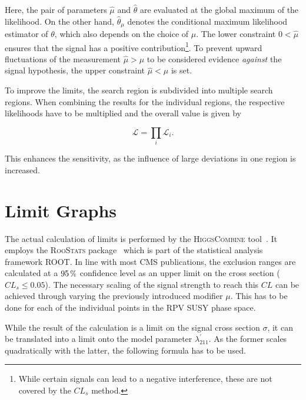 \noindent Here, the pair of parameters $\hat{\mu}$ and $\hat{\theta}$ are evaluated at the global maximum of the likelihood. On the other hand, $\hat{\theta}_\mu$ denotes the conditional maximum likelihood estimator of $\theta$, which also depends on the choice of $\mu$. The lower constraint $0 < \hat{\mu}$ ensures that the signal has a positive contribution\footnote{While certain signals can lead to a negative interference, these are not covered by the $CL_s$ method.}. To prevent upward fluctuations of the measurement $\hat{\mu} > \mu$ to be considered evidence \textit{against} the signal hypothesis, the upper constraint $\hat{\mu} < \mu$ is set.


To improve the limits, the search region is subdivided into multiple search regions. When combining the results for the individual regions, the respective likelihoods have to be multiplied and the overall value is given by

\begin{equation}
  \label{eq:likelihood-product}
  \mathcal{L} = \prod_i \mathcal{L}_i.
\end{equation}

\noindent This enhances the sensitivity, as the influence of large deviations in one region is increased.

\section{Limit Graphs}
\label{sec:limit-graphs}

The actual calculation of limits is performed by the \textsc{HiggsCombine} tool~\cite{clsmod,higgscombine}. It employs the \textsc{RooStats} package~\cite{roostats} which is part of the statistical analysis framework \textsc{ROOT}. In line with most CMS publications, the exclusion ranges are calculated at a $95\,\pct$ confidence level as an upper limit on the cross section ($CL_s \leq 0.05$). The necessary scaling of the signal strength to reach this $CL$ can be achieved through varying the previously introduced modifier $\mu$. This has to be done for each of the individual points in the RPV SUSY phase space.

While the result of the calculation is a limit on the signal cross section $\sigma$, it can be translated into a limit onto the model parameter $\lambda^\prime_{211}$. As the former scales quadratically with the latter, the following formula has to be used.

